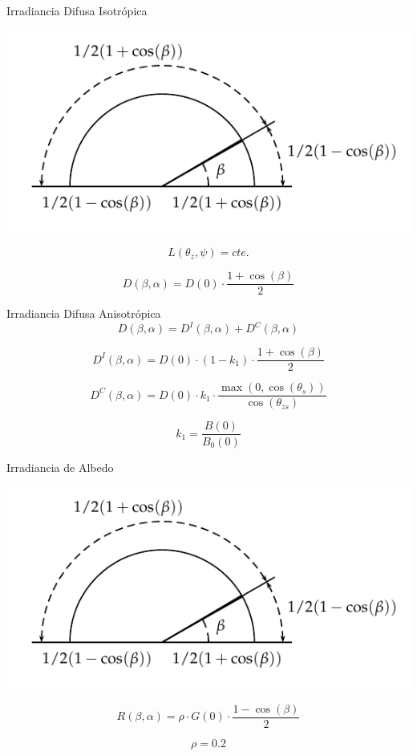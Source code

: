 \documentclass[xcolor={usenames,svgnames,dvipsnames}]{beamer}
\begin{document}
\begin{frame}[label={sec:orgb346ba4}]{Irradiancia Difusa Isotrópica}
\begin{center}
\includegraphics[width=.9\linewidth]{../figs/AnguloVisionCielo.pdf}
\end{center}


\[L(\theta_{z},\psi)=cte.\]

\[D(\beta,\alpha)=D(0)\cdot\frac{1+\cos(\beta)}{2}\]
\end{frame}
\begin{frame}[label={sec:orgbca189e}]{Irradiancia Difusa Anisotrópica}
\[D(\beta,\alpha) = D^{I}(\beta,\alpha)+D^{C}(\beta,\alpha)\]

\[D^{I}(\beta,\alpha) = D(0) \cdot (1-k_{1}) \cdot \frac{1 + \cos(\beta)}{2}\]

\[D^{C}(\beta,\alpha) = D(0) \cdot k_{1} \cdot \frac{\max(0,\cos(\theta_{s}))}{\cos(\theta_{zs})}\]

\[k_{1} = \frac{B(0)}{B_{0}(0)}\]
\end{frame}

\begin{frame}[label={sec:org0288a6c}]{Irradiancia de Albedo}
\begin{center}
\includegraphics[width=.9\linewidth]{../figs/AnguloVisionCielo.pdf}
\end{center}


\[R(\beta,\alpha)=\rho\cdot G(0)\cdot\frac{1-\cos(\beta)}{2}\]

\[\rho=0.2\]
\end{frame}
\end{document}
